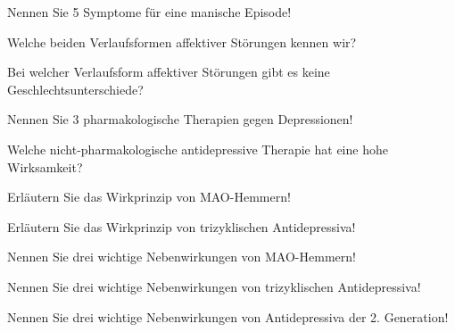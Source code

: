 \documentclass[10pt, a4paper]{exam}
\begin{document}
\begin{questions}
  \question Nennen Sie 5 Symptome für eine manische Episode!
  \begin{solution}

  \end{solution}

  \question Welche beiden Verlaufsformen affektiver Störungen kennen wir?
  \begin{solution}

  \end{solution}

  \question Bei welcher Verlaufsform affektiver Störungen gibt es keine Geschlechtsunterschiede?
  \begin{solution}

  \end{solution}

  \question Nennen Sie 3 pharmakologische Therapien gegen Depressionen!
  \begin{solution}

  \end{solution}

  \question Welche nicht-pharmakologische antidepressive Therapie hat eine hohe Wirksamkeit?
  \begin{solution}

  \end{solution}

  \question Erläutern Sie das Wirkprinzip von MAO-Hemmern!
  \begin{solution}

  \end{solution}

  \question Erläutern Sie das Wirkprinzip von trizyklischen Antidepressiva!
  \begin{solution}

  \end{solution}

  \question Nennen Sie drei wichtige Nebenwirkungen von MAO-Hemmern!
  \begin{solution}

  \end{solution}

  \question Nennen Sie drei wichtige Nebenwirkungen von trizyklischen Antidepressiva!
  \begin{solution}

  \end{solution}

  \question Nennen Sie drei wichtige Nebenwirkungen von Antidepressiva der 2.  Generation!
  \begin{solution}


\end{solution}
\end{questions}
\end{document}
